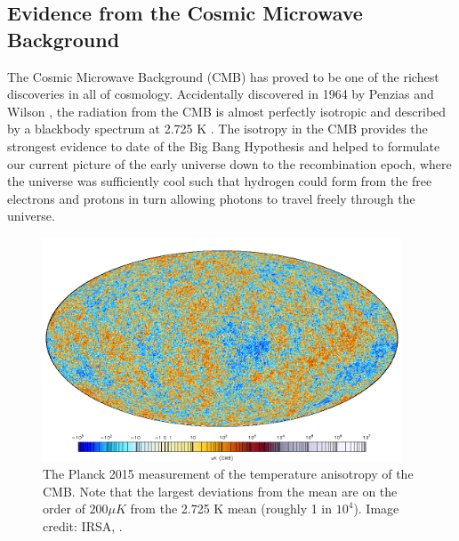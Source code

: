 \subsection{Evidence from the Cosmic Microwave Background}

The Cosmic Microwave Background (CMB) has proved to be one of the richest discoveries in all of cosmology.  Accidentally discovered in 1964 by Penzias and Wilson \cite{penzias1965measurement}, the radiation from the CMB is almost perfectly isotropic and described by a blackbody spectrum at 2.725 K \cite{fixsen1996cosmic}.  The isotropy in the CMB provides the strongest evidence to date of the Big Bang Hypothesis and helped to formulate our current picture of the early universe down to the recombination epoch, where the universe was sufficiently cool such that hydrogen could form from the free electrons and protons in turn allowing photons to travel freely through the universe.  

\begin{figure}[ht]
	\centering
	\includegraphics[width=0.95\textwidth]{planck_map}
	\caption{The Planck 2015 measurement of the temperature anisotropy of the CMB.  Note that the largest deviations from the mean are on the order of $200 \mu K$ from the 2.725 K mean (roughly 1 in $10^4$).  Image credit: IRSA, \cite{Ade2015}.}
	\label{fig:planck_map}
\end{figure}

